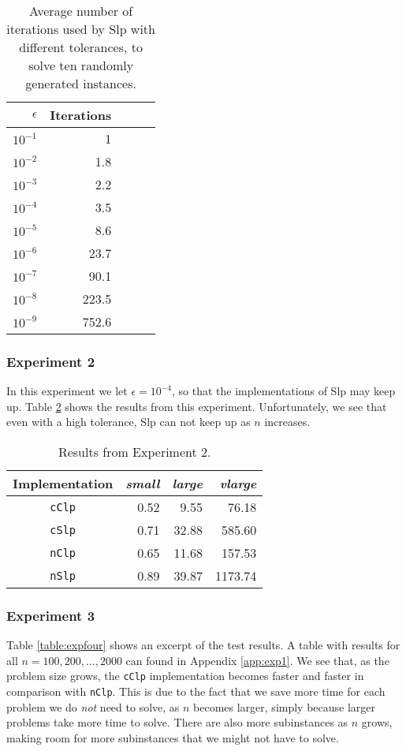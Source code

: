 \begin{table}[ht!]
\centering
\caption{Average number of iterations used by Slp with different tolerances,
         to solve ten randomly generated instances.}
\label{table:expiters}
\begin{tabular}{rrrrr}
$\epsilon$ & Iterations \\ \hline
$10^{-1}$  & 1 \\
$10^{-2}$  & 1.8 \\
$10^{-3}$  & 2.2 \\
$10^{-4}$  & 3.5 \\
$10^{-5}$  & 8.6 \\
$10^{-6}$  & 23.7 \\
$10^{-7}$  & 90.1 \\
$10^{-8}$  & 223.5 \\
$10^{-9}$  & 752.6
\end{tabular}
\end{table}

\subsubsection{Experiment 2}
In this experiment we let $\epsilon = 10^{-4}$, so that the implementations
of Slp may keep up. Table \ref{table:eps4instances} shows the results from
this experiment.
Unfortunately, we see that even with a high tolerance, Slp can not keep up as
$n$ increases.

\begin{table}
\centering
\caption{Results from Experiment 2.}
\label{table:eps4instances}
\begin{tabular}{crrr}
\textrm{Implementation} & \textit{small} & \textit{large} & \textit{vlarge} \\ \hline
\texttt{cClp}           & 0.52           & 9.55           & 76.18 \\
\texttt{cSlp}           & 0.71           & 32.88          & 585.60 \\
\texttt{nClp}           & 0.65           & 11.68          & 157.53 \\
\texttt{nSlp}           & 0.89           & 39.87          & 1173.74
\end{tabular}
\end{table}

\subsubsection{Experiment 3}
Table \ref{table:expfour} shows an excerpt of the test results.
A table with results for all $n=100,200,\ldots,2000$ can found in Appendix
\ref{app:exp1}.
We see that, as the problem size grows, the \texttt{cClp}
implementation becomes faster and faster in comparison with
\texttt{nClp}.
This is due to the fact that we save more time for each problem we do
\emph{not} need to solve, as $n$ becomes larger, simply because larger problems
take more time to solve.
There are also more subinstances as
$n$ grows, making room for more subinstances that we might not have to solve.

